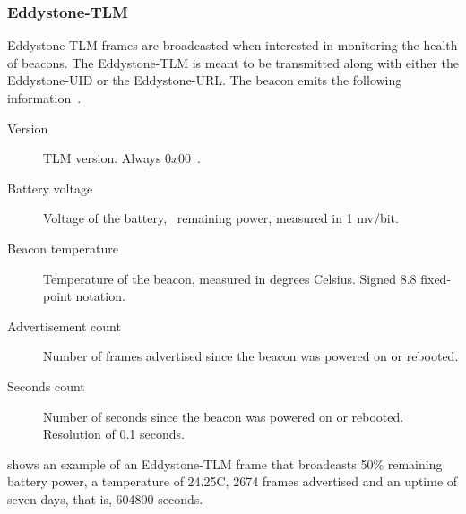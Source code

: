 \subsubsection{Eddystone-TLM}

Eddystone-TLM frames are broadcasted when interested in monitoring the health of beacons. The Eddystone-TLM is meant to be transmitted along with either the Eddystone-UID or the Eddystone-URL. The beacon emits the following information~\cite{eddystone:protocol-tlm-spec}.

\begin{description}
\item[Version] TLM version. Always $0x00$~\cite{eddystone:protocol-tlm-spec}.
\item[Battery voltage] Voltage of the battery, \ie~remaining power, measured in 1 mv/bit.
\item[Beacon temperature] Temperature of the beacon, measured in degrees Celsius. Signed 8.8 fixed-point notation.
\item[Advertisement count] Number of frames advertised since the beacon was powered on or rebooted.
\item[Seconds count] Number of seconds since the beacon was powered on or rebooted. Resolution of 0.1 seconds.
\end{description}

 shows an example of an Eddystone-TLM frame that broadcasts 50\% remaining battery power, a temperature of 24.25\degree C, 2674 frames advertised and an uptime of seven days, that is, 604800 seconds.

